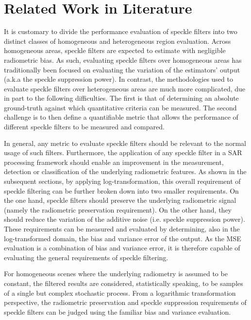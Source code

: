 \documentclass[journal]{IEEEtran}
\begin{document}
\section{Related Work in Literature}
\label{sec:lit_review}

It is customary to divide the performance evaluation of speckle filters into two distinct classes of 
	homogeneous and heterogeneous region evaluation.
Across homogeneous areas, speckle filters are expected to estimate with negligible radiometric bias.
As such, evaluating speckle filters over homogeneous areas has traditionally been focused on evaluating the variation of the estimators'
	output (a.k.a the speckle suppression power).
In contrast, the methodologies used to evaluate speckle filters over heterogeneous areas are much more complicated, 
	due in part to the following difficulties.
The first is that of determining an absolute ground-truth against which quantitative criteria can be measured.
The second challenge is to then define a quantifiable metric that allows the performance of different speckle filters 
	to be measured and compared.

In general, any metric to evaluate speckle filters should be relevant to the normal usage of such filters.
Furthermore, the application of any speckle filter in a SAR processing framework
   should enable an improvement in the measurement, 
	detection or classification of the underlying radiometric features.
As shown in the subsequent sections, by applying log-transformation, 
	this overall requirement of speckle filtering can be further broken down into two smaller requirements.
On the one hand, speckle filters should preserve the underlying radiometric signal (namely the radiometric 
	preservation requirement).
On the other hand, they should reduce the variation of the additive noise (i.e. speckle suppression power).
These requirements can be measured and evaluated by determining, also in the log-transformed domain, the bias 
	and variance error of the output.
As the MSE evaluation is a combination of bias and variance error, it is therefore capable of evaluating 
	the general requirements of speckle filtering.

For homogeneous scenes where the underlying radiometry is assumed to be constant, 
	the filtered results are considered, statistically speaking, to be samples of 
	a single but complex stochastic process.
From a logarithmic transformation perspective, the radiometric preservation and speckle suppression requirements 
	of speckle filters can be judged using the familiar bias and variance evaluation.
\end{document}
